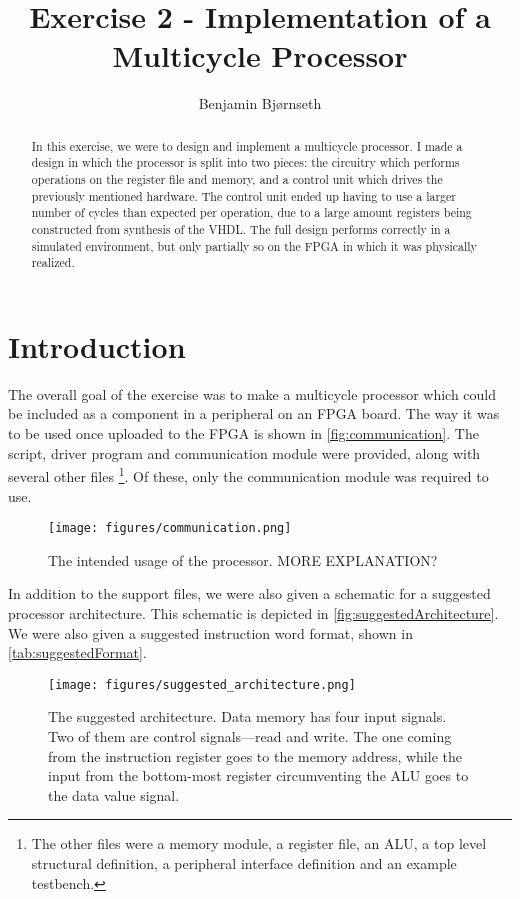 \documentclass[11pt]{article}
\title{Exercise 2 - Implementation of a Multicycle Processor}
\author{Benjamin Bj\o rnseth}
\begin{document}
\maketitle

\begin{abstract}
  In this exercise, we were to design and implement a multicycle processor. I
  made a design in which the processor is split into two pieces: the circuitry
  which performs operations on the register file and memory, and a control unit
  which drives the previously mentioned hardware. The control unit ended up
  having to use a larger number of cycles than expected per operation, due to a
  large amount registers being constructed from synthesis of the VHDL. The full
  design performs correctly in a simulated environment, but only partially so on
  the FPGA in which it was physically realized.
\end{abstract}

\section{Introduction}
\label{sec:introduction}
The overall goal of the exercise was to make a multicycle processor
which could be included as a component in a peripheral on an FPGA
board. The way it was to be used once uploaded to the FPGA is shown in
\autoref{fig:communication}. The script, driver program and
communication module were provided, along with several other files
\footnote{The other files were a memory module, a register file, an
  ALU, a top level structural definition, a peripheral interface
  definition and an example testbench.}. Of these, only the
communication module was required to use.

\begin{figure}[ht]
  \centering
  \texttt{[image: figures/communication.png]}
  \caption{\label{fig:communication} The intended usage of the
    processor. MORE EXPLANATION?}
\end{figure}

In addition to the support files, we were also given a schematic for a
suggested processor architecture. This schematic is depicted in
\autoref{fig:suggestedArchitecture}. We were also given a suggested
instruction word format, shown in \autoref{tab:suggestedFormat}.
\begin{figure}[ht]
  \centering
  \texttt{[image: figures/suggested\_architecture.png]}
  \caption{\label{fig:suggestedArchitecture} The suggested
    architecture. Data memory has four input signals. Two of them are
    control signals---read and write. The one coming from the
    instruction register goes to the memory address, while the input
    from the bottom-most register circumventing the ALU goes to the
    data value signal.}
\end{figure}
\end{document}
